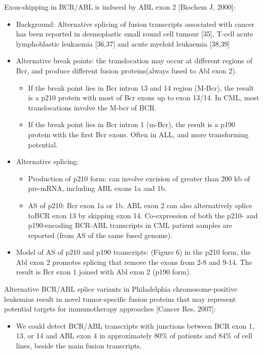 \documentclass{report}
\begin{document}
Exon-skipping in BCR/ABL is induced by ABL exon 2 [Biochem J, 2000]: 
\begin{itemize}
	\item Background: Alternative splicing of fusion transcripts associated with cancer has been reported in desmoplastic small round cell tumour [35], T-cell acute lymphoblastic leukaemia [36,37] and acute myeloid leukaemia [38,39]
	
	\item Alternative break points: the translocation may occur at different regions of Bcr, and produce different fusion proteins(always fused to Abl exon 2). 
	\begin{itemize}
		\item If the break point lies in Bcr intron 13 and 14 region (M-Bcr), the result is a p210 protein with most of Bcr exons up to exon 13/14. In CML, most translocations involve the M-bcr of BCR. 
		\item If the break point lies in Bcr intron 1 (m-Bcr), the result is a p190 protein with the first Bcr exons. Often in ALL, and more transforming potential. 
	\end{itemize}
	
	\item Alternative splicing: 
	\begin{itemize}
		\item Production of p210 form: can involve excision of greater than 200 kb of pre-mRNA, including ABL exons 1a and 1b. 
		\item AS of p210: Bcr exon 1a or 1b. ABL exon 2 can also alternatively splice toBCR exon 13 by skipping exon 14. Co-expression of both the p210- and p190-encoding BCR-ABL transcripts in CML patient samples are reported (from AS of the same fused genome). 
	\end{itemize}
	
	\item Model of AS of p210 and p190 transcripts: (Figure 6) in the p210 form, the Abl exon 2 promotes splicing that remove the exons from 2-8 and 9-14. The result is Bcr exon 1 joined with Abl exon 2 (p190 form). 
	
\end{itemize}

Alternative BCR/ABL splice variants in Philadelphia chromosome-positive leukemias result in novel tumor-specific fusion proteins that may represent potential targets for immunotherapy approaches [Cancer Res, 2007]:
\begin{itemize}
	\item We could detect BCR/ABL transcripts with junctions between BCR exon 1, 13, or 14 and ABL exon 4 in approximately 80\% of patients and 84\% of cell lines, beside the main fusion transcripts.
\end{itemize}
\end{document}
